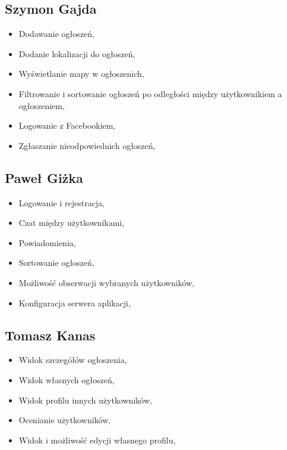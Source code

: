 \documentclass[licencjacka]{pracamgr}
\begin{document}
\subsection{Szymon Gajda}
\begin{itemize}
\setlength\itemsep{-0.2em}
    \item Dodawanie ogłoszeń,
    \item Dodanie lokalizacji do ogłoszeń,
    \item Wyświetlanie mapy w ogłoszenich,
    \item Filtrowanie i sortowanie ogłoszeń po odległości między użytkownikiem a ogłoszeniem,
    \item Logowanie z Facebookiem,
    \item Zgłaszanie nieodpowiednich ogłoszeń,
\end{itemize}{}

\subsection{Paweł Giżka}
\begin{itemize}
\setlength\itemsep{-0.2em}
    \item Logowanie i rejestracja,
    \item Czat między użytkownikami,
    \item Powiadomienia,
    \item Sortowanie ogłoszeń,
    \item Możliwość obserwacji wybranych użytkowników,
    \item Konfiguracja serwera aplikacji,
\end{itemize}{}

\subsection{Tomasz Kanas}
\begin{itemize}
\setlength\itemsep{-0.2em}
    \item Widok szczegółów ogłoszenia,
    \item Widok własnych ogłoszeń,
    \item Widok profilu innych użytkowników,
    \item Ocenianie użytkowników,
    \item Widok i możliwość edycji własnego profilu,
\end{itemize}{}
\end{document}
